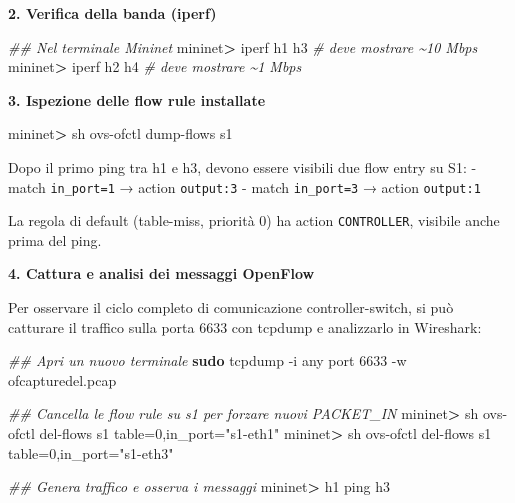 \documentclass[
  italian,
  openany]{book}
\newenvironment{Shaded}{\begin{snugshade}}{\end{snugshade}}
\newcommand{\AttributeTok}[1]{\textcolor[rgb]{0.13,0.29,0.53}{#1}}
\newcommand{\CommentTok}[1]{\textcolor[rgb]{0.56,0.35,0.01}{\textit{#1}}}
\newcommand{\ExtensionTok}[1]{#1}
\newcommand{\FunctionTok}[1]{\textcolor[rgb]{0.13,0.29,0.53}{\textbf{#1}}}
\newcommand{\NormalTok}[1]{#1}
\newcommand{\OperatorTok}[1]{\textcolor[rgb]{0.81,0.36,0.00}{\textbf{#1}}}
\newcommand{\StringTok}[1]{\textcolor[rgb]{0.31,0.60,0.02}{#1}}
\begin{document}
\textbf{2. Verifica della banda (iperf)}

\begin{Shaded}
\begin{Highlighting}[]
\CommentTok{\#\# Nel terminale Mininet}
\ExtensionTok{mininet}\OperatorTok{\textgreater{}}\NormalTok{ iperf h1 h3   }\CommentTok{\# deve mostrare \textasciitilde{}10 Mbps}
\ExtensionTok{mininet}\OperatorTok{\textgreater{}}\NormalTok{ iperf h2 h4   }\CommentTok{\# deve mostrare \textasciitilde{}1 Mbps}
\end{Highlighting}
\end{Shaded}

\textbf{3. Ispezione delle flow rule installate}

\begin{Shaded}
\begin{Highlighting}[]
\ExtensionTok{mininet}\OperatorTok{\textgreater{}}\NormalTok{ sh ovs{-}ofctl dump{-}flows s1}
\end{Highlighting}
\end{Shaded}

Dopo il primo ping tra h1 e h3, devono essere visibili due flow entry su
S1: - match \texttt{in\_port=1} → action \texttt{output:3} - match
\texttt{in\_port=3} → action \texttt{output:1}

La regola di default (table-miss, priorità 0) ha action
\texttt{CONTROLLER}, visibile anche prima del ping.

\textbf{4. Cattura e analisi dei messaggi OpenFlow}

Per osservare il ciclo completo di comunicazione controller-switch, si
può catturare il traffico sulla porta 6633 con tcpdump e analizzarlo in
Wireshark:

\begin{Shaded}
\begin{Highlighting}[]
\CommentTok{\#\# Apri un nuovo terminale}
\FunctionTok{sudo}\NormalTok{ tcpdump }\AttributeTok{{-}i}\NormalTok{ any port 6633 }\AttributeTok{{-}w}\NormalTok{ ofcapturedel.pcap}

\CommentTok{\#\# Cancella le flow rule su s1 per forzare nuovi PACKET\_IN}
\ExtensionTok{mininet}\OperatorTok{\textgreater{}}\NormalTok{ sh ovs{-}ofctl del{-}flows s1 table=0,in\_port=}\StringTok{"s1{-}eth1"}
\ExtensionTok{mininet}\OperatorTok{\textgreater{}}\NormalTok{ sh ovs{-}ofctl del{-}flows s1 table=0,in\_port=}\StringTok{"s1{-}eth3"}

\CommentTok{\#\# Genera traffico e osserva i messaggi}
\ExtensionTok{mininet}\OperatorTok{\textgreater{}}\NormalTok{ h1 ping h3}
\end{Highlighting}
\end{Shaded}
\end{document}
